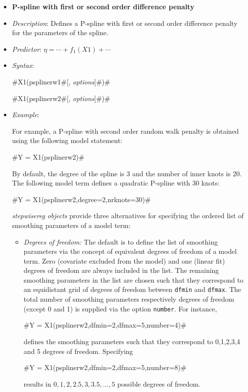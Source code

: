 \begin{itemize}
\item[] {\bf\sffamily P-spline with first or second order difference penalty}
\label{psplines_stepwise}

\item[] {\em Description}: Defines a P-spline with first or second
order difference penalty for the parameters of the spline.
\item[] {\em Predictor}: $\eta =  \cdots + f_1(X1) + \cdots$
\item[] {\em Syntax}:

#X1(psplinerw1#[, {\em options}]#)#

#X1(psplinerw2#[, {\em options}]#)#
\item[] {\em Example}:

For example, a P-spline with second order random walk penalty is
obtained using the following model statement:

#Y = X1(psplinerw2)#

By default, the degree of the spline is 3 and the number of inner
knots is 20. The following model term defines a quadratic P-spline
with 30 knots:

#Y = X1(psplinerw2,degree=2,nrknots=30)#

{\em stepwisereg objects} provide three alternatives for specifying the ordered list of
smoothing parameters of a model term:

\begin{itemize}
\item {\em Degrees of freedom:} The default is to define the list of  smoothing parameters via the concept of
equivalent degrees of freedom of a model term. Zero (covariate excluded from the model) and one (linear fit)
degrees of freedom are always included in the list. The remaining smoothing parameters in the list are chosen such that they
correspond to an equidistant grid of degrees of freedom between {\tt dfmin} and {\tt dfmax}. The total
number of smoothing parameters respectively degrees of freedom (except 0 and 1) is supplied via the option {\tt number}.
For instance,

#Y = X1(psplinerw2,dfmin=2,dfmax=5,number=4)#

defines the smoothing parameters such that they correspond to 0,1,2,3,4 and 5 degrees of freedom. Specifying

#Y = X1(psplinerw2,dfmin=2,dfmax=5,number=8)#

results in $0,1,2,2.5,3,3.5,\dots,5$ possible degrees of freedom.


\end{itemize}
\end{itemize}
